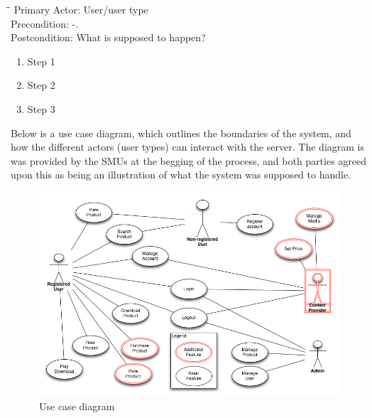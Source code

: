 \begin{tabbing}
\hspace{5mm}\=\hspace{26mm}\=\kill
\>Primary Actor:\> User/user type\\
\>Precondition:\> -.\\
\>Postcondition:\> What is supposed to happen?
\end{tabbing}
\begin{enumerate}
	\item Step 1
	\item Step 2
	\item Step 3
\end{enumerate}
\vspace{3mm}

Below is a use case diagram, which outlines the boundaries of the system, and how the different actors (user types) can interact with the server.
The diagram is was provided by the SMUs at the begging of the process, and both parties agreed upon this as being an illustration of what the system was supposed to handle.
\begin{figure}[ht!]
\centering
\includegraphics[width=160mm]{illustrations/UseCase.png}
\caption{Use case diagram}
\label{useCaseImg}
\end{figure}